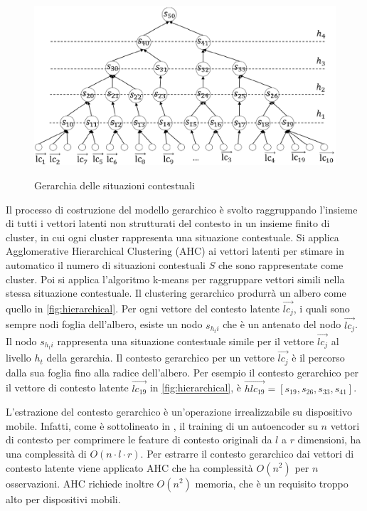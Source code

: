 \begin{figure}
 \centering
  \includegraphics[scale=0.70]{immagini/hierarchical.png}
  \caption{Gerarchia delle situazioni contestuali}
  \label{fig:hierarchical}
  \cite{hierarchical-context}
\end{figure}

Il processo di costruzione del modello gerarchico è svolto raggruppando l'insieme di tutti i vettori latenti non strutturati del contesto in un insieme finito di cluster, in cui ogni cluster rappresenta una situazione contestuale. Si applica Agglomerative Hierarchical Clustering (AHC) \cite{AHC} ai vettori latenti per stimare in automatico il numero di situazioni contestuali $S$ che sono rappresentate come cluster. Poi si applica l'algoritmo k-means  per raggruppare vettori simili nella stessa situazione contestuale. Il clustering gerarchico produrrà un albero come quello in \autoref{fig:hierarchical}. Per ogni vettore del contesto latente $\overrightarrow{lc_j}$, i quali sono sempre nodi foglia dell'albero, esiste un nodo $s_{h_ti}$ che è un antenato del nodo $\overrightarrow{lc_j}$. Il nodo $s_{h_ti}$ rappresenta una situazione contestuale simile per il vettore $\overrightarrow{lc_j}$ al livello $h_t$ della gerarchia. Il contesto gerarchico per un vettore $\overrightarrow{lc_j}$ è il percorso dalla sua foglia fino alla radice dell'albero. Per esempio il contesto gerarchico per il vettore di contesto latente $\overrightarrow{lc_{19}}$ in \autoref{fig:hierarchical}, è $\overrightarrow{hlc_{19}} = [s_{19}, s_{26}, s_{33}, s_{41}]$.

L'estrazione del contesto gerarchico è un'operazione irrealizzabile su dispositivo mobile. Infatti, come è sottolineato in \cite{hierarchical-context}, il training di un autoencoder su $n$ vettori di contesto per comprimere le feature di contesto originali da $l$ a $r$ dimensioni, ha una complessità di $O(n \cdot l \cdot r)$. Per estrarre il contesto gerarchico dai vettori di contesto latente viene applicato AHC che ha complessità $O(n^2)$ per $n$ osservazioni. AHC richiede inoltre $O(n^2)$ memoria, che è un requisito troppo alto per dispositivi mobili. 


